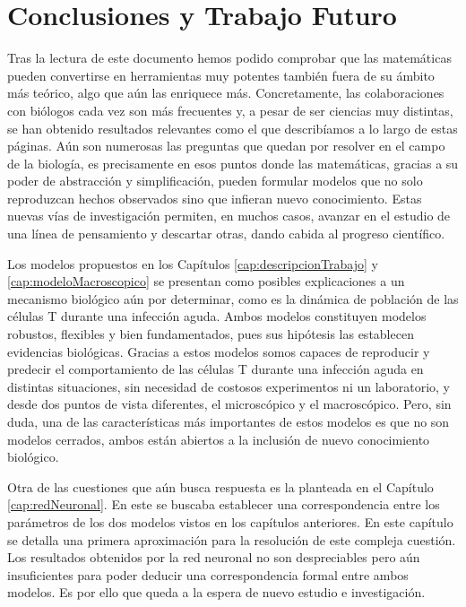 \chapter{Conclusiones y Trabajo Futuro}
\label{cap:conclusiones}



Tras la lectura de este documento hemos podido comprobar que las matemáticas pueden convertirse en herramientas muy potentes también fuera de su ámbito más teórico, algo que aún las enriquece más. Concretamente, las colaboraciones con biólogos cada vez son más frecuentes y, a pesar de ser ciencias muy distintas, se han obtenido resultados relevantes como el que describíamos a lo largo de estas páginas. Aún son numerosas las preguntas que quedan por resolver en el campo de la biología, es precisamente en esos puntos donde las matemáticas, gracias a su poder de abstracción y simplificación, pueden formular modelos que no solo reproduzcan hechos observados sino que infieran nuevo conocimiento. Estas nuevas vías de investigación permiten, en muchos casos, avanzar en el estudio de una línea de pensamiento y descartar otras, dando cabida al progreso científico.

Los modelos propuestos en los Capítulos \ref{cap:descripcionTrabajo} y \ref{cap:modeloMacroscopico} se presentan como posibles explicaciones a un mecanismo biológico aún por determinar, como es la dinámica de población de las células T durante una infección aguda. Ambos modelos constituyen modelos robustos, flexibles y bien fundamentados, pues sus hipótesis las establecen evidencias biológicas. Gracias a estos modelos somos capaces de reproducir y predecir el comportamiento de las células T durante una infección aguda en distintas situaciones, sin necesidad de costosos experimentos ni un laboratorio, y desde dos puntos de vista diferentes, el microscópico y el macroscópico. Pero, sin duda, una de las características más importantes de estos modelos es que no son modelos cerrados, ambos están abiertos a la inclusión de nuevo conocimiento biológico. 

Otra de las cuestiones que aún busca respuesta es la planteada en el Capítulo \ref{cap:redNeuronal}. En este se buscaba establecer una correspondencia entre los parámetros de los dos modelos vistos en los capítulos anteriores. En este capítulo se detalla una primera aproximación para la resolución de este compleja cuestión. Los resultados obtenidos por la red neuronal no son despreciables pero aún insuficientes para poder deducir una correspondencia formal entre ambos modelos. Es por ello que queda a la espera de nuevo estudio e investigación.

